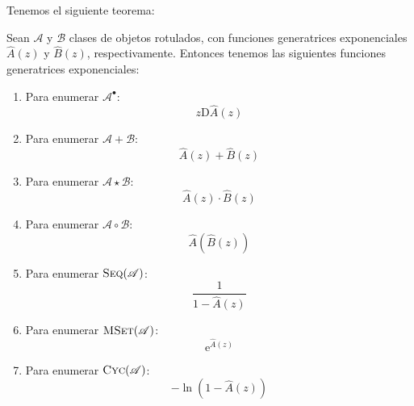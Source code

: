   Tenemos el siguiente teorema:
  \begin{theorem}
    \label{theo:ms-EGF}
    Sean \(\mathscr{A}\) y \(\mathscr{B}\) clases de objetos rotulados,
    con funciones generatrices exponenciales
    \(\widehat{A}(z)\) y \(\widehat{B}(z)\),
    respectivamente.
    Entonces tenemos
    las siguientes funciones generatrices exponenciales:
    \begin{enumerate}
    \item
      Para enumerar \(\mathscr{A}^\bullet\):
      \begin{equation*}
        z \mathrm{D} \widehat{A}(z)
      \end{equation*}
    \item
      Para enumerar \(\mathscr{A} + \mathscr{B}\):
      \begin{equation*}
        \widehat{A}(z) + \widehat{B}(z)
      \end{equation*}
    \item
      Para enumerar \(\mathscr{A} \star \mathscr{B}\):
      \begin{equation*}
        \widehat{A}(z) \cdot \widehat{B}(z)
      \end{equation*}
    \item
      Para enumerar \(\mathscr{A} \circ \mathscr{B}\):
      \begin{equation*}
        \widehat{A}(\widehat{B}(z))
      \end{equation*}
    \item
      Para enumerar \(\operatorname{\textsc{Seq}}(\mathscr{A})\):
      \begin{equation*}
        \frac{1}{1 - \widehat{A}(z)}
      \end{equation*}
    \item
      Para enumerar \(\operatorname{\textsc{MSet}}(\mathscr{A})\):
      \begin{equation*}
        \mathrm{e}^{\widehat{A}(z)}
      \end{equation*}
    \item
      Para enumerar \(\operatorname{\textsc{Cyc}}(\mathscr{A})\):
      \begin{equation*}
        -\ln(1 - \widehat{A}(z))
      \end{equation*}
    \end{enumerate}
  \end{theorem}
